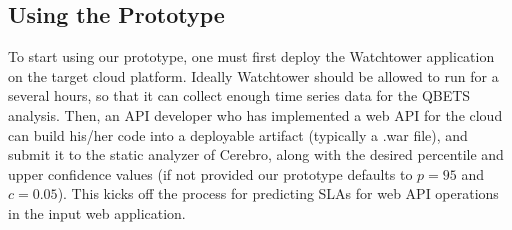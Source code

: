\subsection{Using the Prototype}
To start using our prototype, one must first deploy the Watchtower application on the target cloud platform. 
Ideally Watchtower should be allowed to run for a several hours,
so that it can collect enough time series data for the QBETS analysis. Then,
an API developer who has implemented a web API for the cloud can build his/her code into a deployable
artifact (typically a .war file), and submit it to the static analyzer of Cerebro, along with the desired percentile
and upper confidence values (if not provided our prototype defaults to $p=95$ and $c=0.05$). This kicks off
the process for predicting SLAs for web API operations in the input web application.
